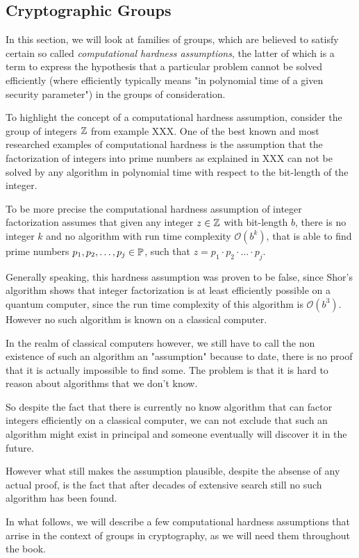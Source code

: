 \subsection{Cryptographic Groups} In this section, we will look at families of groups, which are believed to satisfy certain so called \textit{computational hardness assumptions}, the latter of which is a term to express the hypothesis that a particular problem cannot be solved efficiently (where efficiently typically means "in polynomial time of a given security parameter") in the groups of consideration. 
\begin{example} 
To highlight the concept of a computational hardness assumption, consider the group of integers $\mathbb{Z}$ from example XXX. One of the best known and most researched examples of computational hardness is the assumption that the factorization of integers into prime numbers as explained in XXX can not be solved by any algorithm in polynomial time with respect to the bit-length of the integer.

To be more precise the computational hardness assumption of integer factorization assumes that given any integer $z\in\mathbb{Z}$ with bit-length $b$, there is no integer $k$ and no algorithm with run time complexity $\mathcal{O}(b^k)$, that is able to find prime numbers $p_1, p_2,\ldots,p_j\in\mathbb{P}$, such that $z=p_1\cdot p_2\cdot \ldots\cdot p_j$. 

Generally speaking, this hardness assumption was proven to be false, since Shor's algorithm shows that integer factorization is at least efficiently possible on a quantum computer, since the run time complexity of this algorithm is $\mathcal{O}(b^3)$. However no such algorithm is known on a classical computer.

In the realm of classical computers however, we still have to call the non existence of such an algorithm an "assumption" because to date, there is no proof that it is actually impossible to find some. The problem is that it is hard to reason about algorithms that we don't know.

So despite the fact that there is currently no know algorithm that can factor integers efficiently on a classical computer, we can not exclude that such an algorithm might exist in principal and someone eventually will discover it in the future.

However what still makes the assumption plausible, despite the absense of any actual proof, is the fact that after decades of extensive search still no such algorithm has been found.
\end{example}
In what follows, we will describe a few computational hardness assumptions that arrise in the context of groups in cryptography, as we will need them throughout the book.
